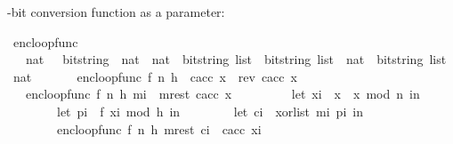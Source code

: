 \begin{isabellebody}
\begin{isamarkuptext}
-bit conversion function as a parameter:%
\end{isamarkuptext}\isamarkuptrue%
\isamarkupfalse%
\ enc{\isacharunderscore}{\kern0pt}loop{\isacharunderscore}{\kern0pt}func\ \isanewline
\ \ {\isacharcolon}{\kern0pt}{\isacharcolon}{\kern0pt}\ {\isachardoublequoteopen}{\isacharparenleft}{\kern0pt}{\isacharparenleft}{\kern0pt}nat\ \ {\isacharequal}{\kern0pt}{\isachargreater}{\kern0pt}\ bitstring{\isacharparenright}{\kern0pt}\ {\isasymtimes}\ nat\ {\isasymtimes}\ nat\ {\isasymtimes}\ bitstring\ list{\isacharparenright}{\kern0pt}\ {\isasymRightarrow}\ bitstring\ list\ {\isasymRightarrow}\ nat\ {\isasymRightarrow}\ {\isacharparenleft}{\kern0pt}bitstring\ list\ {\isasymtimes}\ nat{\isacharparenright}{\kern0pt}{\isachardoublequoteclose}\ \isanewline
\ \ \isanewline
\ \ \ {\isachardoublequoteopen}enc{\isacharunderscore}{\kern0pt}loop{\isacharunderscore}{\kern0pt}func\ {\isacharparenleft}{\kern0pt}f{\isacharcomma}{\kern0pt}\ n{\isacharcomma}{\kern0pt}\ h{\isacharcomma}{\kern0pt}\ {\isacharbrackleft}{\kern0pt}{\isacharbrackright}{\kern0pt}{\isacharparenright}{\kern0pt}\ c{\isacharunderscore}{\kern0pt}acc\ x\ {\isacharequal}{\kern0pt}\ {\isacharparenleft}{\kern0pt}rev\ c{\isacharunderscore}{\kern0pt}acc{\isacharcomma}{\kern0pt}\ x{\isacharparenright}{\kern0pt}{\isachardoublequoteclose}\ {\isacharbar}{\kern0pt}\isanewline
\ \ \ {\isachardoublequoteopen}enc{\isacharunderscore}{\kern0pt}loop{\isacharunderscore}{\kern0pt}func\ {\isacharparenleft}{\kern0pt}f{\isacharcomma}{\kern0pt}\ n{\isacharcomma}{\kern0pt}\ h{\isacharcomma}{\kern0pt}\ {\isacharparenleft}{\kern0pt}m{\isacharunderscore}{\kern0pt}i\ {\isacharhash}{\kern0pt}\ m{\isacharunderscore}{\kern0pt}rest{\isacharparenright}{\kern0pt}{\isacharparenright}{\kern0pt}\ c{\isacharunderscore}{\kern0pt}acc\ x\ {\isacharequal}{\kern0pt}\isanewline
\ \ \ \ \ \ \ \ {\isacharparenleft}{\kern0pt}let\ x{\isacharunderscore}{\kern0pt}i\ {\isacharequal}{\kern0pt}\ x\ {\isacharasterisk}{\kern0pt}\ x\ mod\ n\ in\isanewline
\ \ \ \ \ \ \ \ let\ p{\isacharunderscore}{\kern0pt}i\ {\isacharequal}{\kern0pt}\ f\ {\isacharparenleft}{\kern0pt}x{\isacharunderscore}{\kern0pt}i\ mod\ {}{\isacharcircum}{\kern0pt}h{\isacharparenright}{\kern0pt}\ in\isanewline
\ \ \ \ \ \ \ \ let\ c{\isacharunderscore}{\kern0pt}i\ {\isacharequal}{\kern0pt}\ xor{\isacharunderscore}{\kern0pt}list\ m{\isacharunderscore}{\kern0pt}i\ p{\isacharunderscore}{\kern0pt}i\ in\isanewline
\ \ \ \ \ \ \ \ enc{\isacharunderscore}{\kern0pt}loop{\isacharunderscore}{\kern0pt}func\ {\isacharparenleft}{\kern0pt}f{\isacharcomma}{\kern0pt}\ n{\isacharcomma}{\kern0pt}\ h{\isacharcomma}{\kern0pt}\ m{\isacharunderscore}{\kern0pt}rest{\isacharparenright}{\kern0pt}\ {\isacharparenleft}{\kern0pt}c{\isacharunderscore}{\kern0pt}i\ {\isacharhash}{\kern0pt}\ c{\isacharunderscore}{\kern0pt}acc{\isacharparenright}{\kern0pt}\ x{\isacharunderscore}{\kern0pt}i\isanewline

\end{isabellebody}
